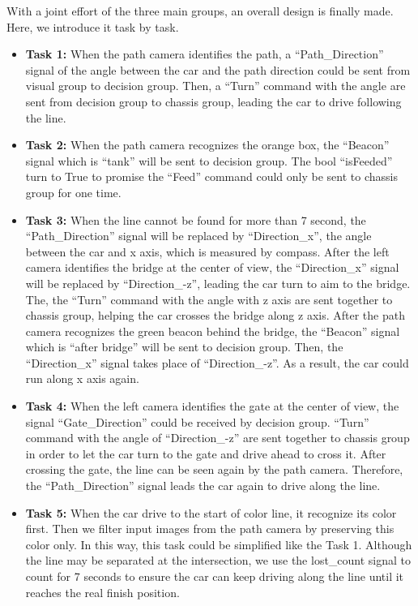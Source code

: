 With a joint effort of the three main groups, an overall design is finally made. Here, we introduce it task by task.
\begin{itemize}
    \item \textbf{Task 1:} When the path camera identifies the path, a “Path\_Direction” signal of the angle between the car and the path direction could be sent from visual group to decision group. Then, a “Turn” command with the angle are sent from decision group to chassis group, leading the car to drive following the line.
    \item \textbf{Task 2:} When the path camera recognizes the orange box, the “Beacon” signal which is “tank” will be sent to decision group. The bool “isFeeded” turn to True to promise the “Feed” command could only be sent to chassis group for one time.
    \item \textbf{Task 3:} When the line cannot be found for more than 7 second, the “Path\_Direction” signal will be replaced by “Direction\_x”, the angle between the car and x axis, which is measured by compass. After the left camera identifies the bridge at the center of view, the “Direction\_x” signal will be replaced by “Direction\_-z”, leading the car turn to aim to the bridge. The, the “Turn” command with the angle with z axis are sent together to chassis group, helping the car crosses the bridge along z axis. After the path camera recognizes the green beacon behind the bridge, the “Beacon” signal which is “after bridge” will be sent to decision group. Then, the “Direction\_x” signal takes place of “Direction\_-z”. As a result, the car could run along x axis again.
    \item \textbf{Task 4:} When the left camera identifies the gate at the center of view, the signal “Gate\_Direction” could be received by decision group. “Turn” command with the angle of “Direction\_-z” are sent together to chassis group in order to let the car turn to the gate and drive ahead to cross it. After crossing the gate, the line can be seen again by the path camera. Therefore, the “Path\_Direction” signal leads the car again to drive along the line.
    \item \textbf{Task 5:} When the car drive to the start of color line, it recognize its color first. Then we filter input images from the path camera by preserving this color only. In this way, this task could be simplified like the Task 1. Although the line may be separated at the intersection, we use the lost\_count signal to count for 7 seconds to ensure the car can keep driving along the line until it reaches the real finish position.
\end{itemize}

